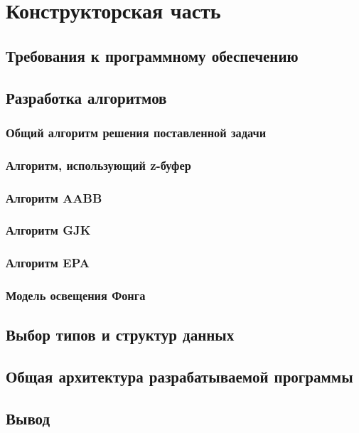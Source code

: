 \section{Конструкторская часть}


\subsection{Требования к программному обеспечению}


\subsection{Разработка алгоритмов}

\subsubsection{Общий алгоритм решения поставленной задачи}

\subsubsection{Алгоритм, использующий z-буфер}

\subsubsection{Алгоритм AABB}

\subsubsection{Алгоритм GJK}

\subsubsection{Алгоритм EPA}

\subsubsection{Модель освещения Фонга}

\subsection{Выбор типов и структур данных}

\subsection{Общая архитектура разрабатываемой программы}


\subsection*{Вывод}

